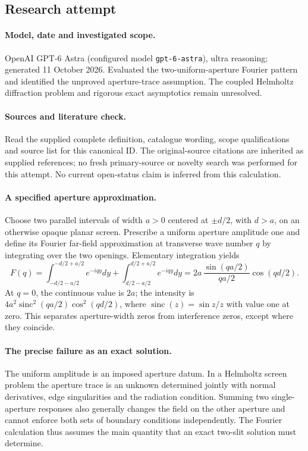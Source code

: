 \documentclass[11pt]{article}
\begin{document}
\subsection{Research attempt}
\paragraph{Model, date and investigated scope.}
OpenAI GPT-6 Astra (configured model \texttt{gpt-6-astra}), ultra reasoning; generated 11 October 2026. Evaluated the two-uniform-aperture Fourier pattern and identified the unproved aperture-trace assumption. The coupled Helmholtz diffraction problem and rigorous exact asymptotics remain unresolved.

\paragraph{Sources and literature check.}
Read the supplied complete definition, catalogue wording, scope qualifications and source list for this canonical ID. The original-source citations are inherited as supplied references; no fresh primary-source or novelty search was performed for this attempt. No current open-status claim is inferred from this calculation.

\paragraph{A specified aperture approximation.}Choose two parallel intervals of width \(a>0\) centered at \(\pm d/2\), with \(d>a\), on an otherwise opaque planar screen. Prescribe a uniform aperture amplitude one and define its Fourier far-field approximation at transverse wave number \(q\) by integrating over the two openings. Elementary integration yields
\[F(q)=\int_{-d/2-a/2}^{-d/2+a/2}e^{-iqy}dy+\int_{d/2-a/2}^{d/2+a/2}e^{-iqy}dy
=2a\,\frac{\sin(qa/2)}{qa/2}\cos(qd/2).
\]
At \(q=0\), the continuous value is \(2a\); the intensity is \(4a^2\operatorname{sinc}^2(qa/2)\cos^2(qd/2)\), where \(\operatorname{sinc}(z)=\sin z/z\) with value one at zero. This separates aperture-width zeros from interference zeros, except where they coincide.
\paragraph{The precise failure as an exact solution.}The uniform amplitude is an imposed aperture datum. In a Helmholtz screen problem the aperture trace is an unknown determined jointly with normal derivatives, edge singularities and the radiation condition. Summing two single-aperture responses also generally changes the field on the other aperture and cannot enforce both sets of boundary conditions independently. The Fourier calculation thus assumes the main quantity that an exact two-slit solution must determine.
\end{document}

